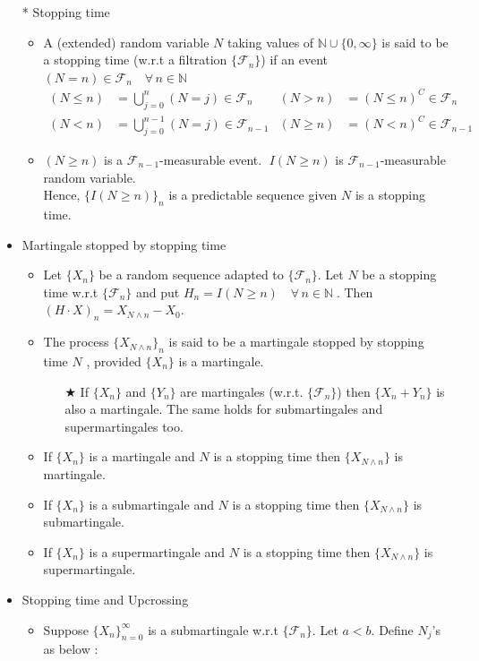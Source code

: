 \documentclass[12pt, A4]{article}
\newcommand{\trick}{$\bigstar$}
\newcommand{\N}{\mathbb{N}}
\newcommand{\F}{\mathcal{F}}
\newcommand{\foranyn}{\quad \forall \, n\in \N}
\begin{document}
\begin{itemize}
\begin{itemize}
	\end{itemize}
	\item[*] Stopping time
	\begin{itemize}
		\item A (extended) random variable $N$ taking values of $\N\cup\{0,\infty\}$ is said to be a stopping time (w.r.t a filtration $\{\F_n\}$) if an event $(N=n)\in \F_n\foranyn$
		\begin{align*}
			(N\leq n)&=\bigcup_{j=0}^n (N=j) \in \F_n	&	(N>n)&=(N\leq n)^C\in \F_n \\
			(N<n)&=\bigcup_{j=0}^{n-1} (N=j) \in \F_{n-1}	& (N\geq n)&=(N<n)^C\in \F_{n-1}
		\end{align*}
		\item $(N\geq n)$ is a $\F_{n-1}$-measurable event. $\;I(N\geq n)$ is $\F_{n-1}$-measurable random variable. \\ Hence, $\{I(N\geq n)\}_n$ is a predictable sequence given $N$ is a stopping time.
	\end{itemize} 
	\item Martingale stopped by stopping time
	\begin{itemize}
		\item Let $\{X_n\}$ be a random sequence adapted to $\{\F_n\}$. Let $N$ be a stopping time w.r.t $\{\F_n\}$ and put $H_n=I(N\geq n)\foranyn\;$. Then $(H\cdot X)_n=X_{N\wedge n}-X_0$. 
		\item The process $\{X_{N\wedge n}\}_n$ is said to be a martingale stopped by stopping time $N$ , provided $\{X_n\}$ is a martingale.
		\begin{itemize}
			\item[\trick] If $\{X_n\}$ and $\{Y_n\}$ are martingales (w.r.t. $\{\F_n\}$) then $\{X_n+Y_n\}$ is also a martingale. The same holds for submartingales and supermartingales too.
		\end{itemize}
		\item If $\{X_n\}$ is a martingale and $N$ is a stopping time then $\{X_{N\wedge n}\}$ is martingale.
		\item If $\{X_n\}$ is a submartingale and $N$ is a stopping time then $\{X_{N\wedge n}\}$ is submartingale.
		\item If $\{X_n\}$ is a supermartingale and $N$ is a stopping time then $\{X_{N\wedge n}\}$ is supermartingale.
	\end{itemize} 
	\item Stopping time and Upcrossing
	\begin{itemize}
		\item Suppose $\{X_n\}_{n=0}^\infty$ is a submartingale w.r.t $\{\F_n\}$. Let $a<b$. Define $N_j$'s as below :

\end{itemize}
\end{itemize}
\end{document}
